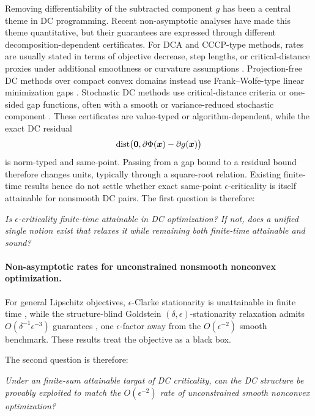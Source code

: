 \documentclass[english]{article}
\begin{document}
Removing differentiability of the subtracted component $g$ has been a
central theme in DC programming. Recent non-asymptotic analyses have
made this theme quantitative, but their guarantees are expressed through
different decomposition-dependent certificates. For DCA and CCCP-type
methods, rates are usually stated in terms of objective decrease, step
lengths, or critical-distance proxies under additional smoothness or
curvature assumptions
\citep{yurtsever2022cccp,abbaszadehpeivasti2023rate}. Projection-free
DC methods over compact convex domains instead use Frank--Wolfe-type
linear minimization gaps \citep{khamaru2018convergence,maskan2025}.
Stochastic DC methods use critical-distance criteria or one-sided gap
functions, often with a smooth or variance-reduced stochastic component
\citep{xu2019stochastic,le2022stochastic,nguyen2025improved}. These
certificates are value-typed or algorithm-dependent, while the exact DC
residual
\[
    \operatorname{dist}\bigl(\bm{0},\partial\Phi(\bm{x})-\partial g(\bm{x})\bigr)
\]
is norm-typed and same-point. Passing from a gap bound to a residual
bound therefore changes units, typically through a square-root relation.
Existing finite-time results hence do not settle whether exact
same-point $\epsilon$-criticality is itself attainable for nonsmooth DC
pairs. The first question is therefore:

\emph{Is $\epsilon$-criticality finite-time attainable in DC
optimization? If not, does a unified single notion exist that relaxes it while
remaining both finite-time attainable and sound?}

\paragraph{Non-asymptotic rates for unconstrained nonsmooth nonconvex
optimization.}
For general Lipschitz objectives, $\epsilon$-Clarke stationarity is
unattainable in finite time \citep{Zhang-2020-Complexity}, while the
structure-blind Goldstein $(\delta,\epsilon)$-stationarity relaxation admits
$O(\delta^{-1}\epsilon^{-3})$ guarantees
\citep{Zhang-2020-Complexity,davis2022gradient},
one $\epsilon$-factor away from the $O(\epsilon^{-2})$ smooth
benchmark. These results treat the objective as a black box. 

The second question is therefore:

\emph{Under an finite-sum attainable targat of DC
criticality, can the DC structure be provably exploited to match the
$O(\epsilon^{-2})$ rate of unconstrained smooth nonconvex
optimization?}
\end{document}
